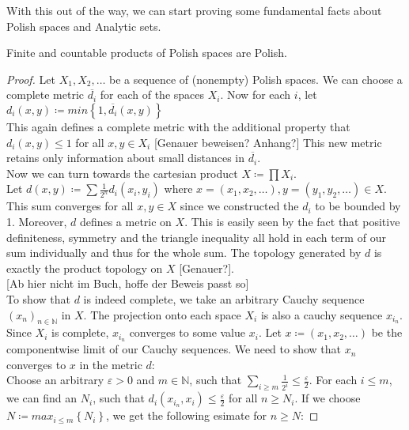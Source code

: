 \documentclass[10pt, a4paper, titlepage]{article}
\numberwithin{equation}{section}
\begin{document}
With this out of the way, we can start proving some fundamental facts about Polish spaces and Analytic sets. 
\begin{lemma}
	\label{products}
	Finite and countable products of Polish spaces are Polish.
\end{lemma}
\begin{proof}
	Let $X_1,X_2,\ldots$ be a sequence of (nonempty) Polish spaces. We can choose a complete metric $\overline{d_i}$ for each of the spaces $X_i$. 
	Now for each $i$, let $d_i \left( x,y \right) \coloneq min \left\{ 1,\overline{d_i} \left( x,y \right)  \right\}$\\
	This again defines a complete metric with the additional property that $d_i\left( x,y \right) \leq 1$ for all $x,y \in X_i$ [Genauer beweisen? Anhang?]
This new metric retains only information about small distances in $\overline{d_i}$.\\
Now we can turn towards the cartesian product $X \coloneq \prod X_i$.\\
Let $d\left( x,y \right)\coloneq \sum \frac{1}{2^{n}} d_i\left( x_{i},y_{i} \right)$
where $x = \left( x_1,x_2,\ldots \right), y = \left( y_1,y_2,\ldots \right) \in X$. 
This sum converges for all $x,y \in X$ since we constructed the $d_i$ to be bounded by 1.
 Moreover, $d$ defines a metric on $X$. This is easily seen by the fact that positive definiteness, symmetry and the triangle inequality all hold in each term of our sum individually and thus for the whole sum. 
 The topology generated by $d$ is exactly the product topology on $X$ [Genauer?].\\

[Ab hier nicht im Buch, hoffe der Beweis passt so] \\
To show that $d$ is indeed complete, we take an arbitrary Cauchy sequence $(x_{n})_{n \in  \mathbb{N}}$ in $X$. The projection onto each  space $X_i$ is also a cauchy sequence  $x_{i_n}$.
 Since $X_i$ is complete, $x_{i_n}$ converges to some value $x_i$. 
Let $x \coloneq \left( x_1,x_2,\ldots \right) $ be the componentwise limit of our Cauchy sequences. We need to show that $x_{n}$ converges to $x$ in the metric $d$:\\
Choose an arbitrary $\varepsilon > 0 $ and $m \in  \mathbb{N}$, such that $\sum_{i \geq m} \frac{1}{2^i} \leq \frac{\varepsilon}{2} $.
For each $i \leq m$, we can find an  $N_i$, such that $d_i\left( x_{i_n},x_i \right) \leq \frac{\varepsilon}{2}$ for all $n\geq N_i$. 
If we choose $N  \coloneq max_{i \leq m}\left\{ N_i \right\} $, we get the following esimate for $n \geq N$: 


\end{proof}
\end{document}
